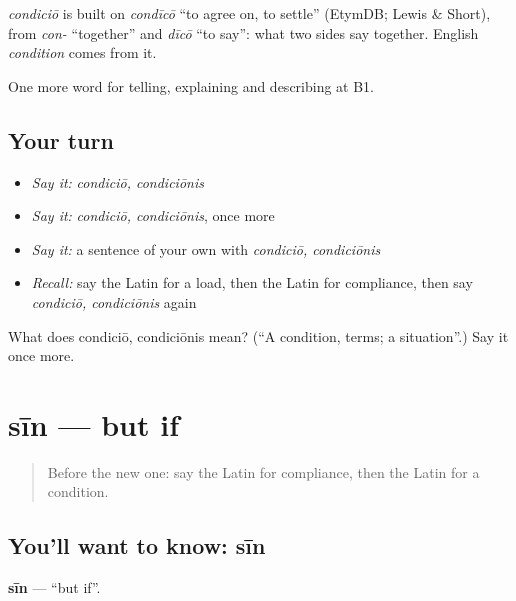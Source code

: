 \begin{cousinweb}
\emph{condiciō} is built on \emph{condīcō} \textquotedblleft{}to agree on, to settle\textquotedblright{} (EtymDB; Lewis \& Short), from \emph{con-} \textquotedblleft{}together\textquotedblright{} and \emph{dīcō} \textquotedblleft{}to say\textquotedblright{}: what two sides say together. English \emph{condition} comes from it.
\end{cousinweb}

\begin{grammarlens}[title={What you've built}]
One more word for telling, explaining and describing at B1.
\end{grammarlens}

\subsection*{Your turn}
\begin{itemize}
\raggedright
  \item \emph{Say it:} \emph{condiciō, condiciōnis}
  \item \emph{Say it:} \emph{condiciō, condiciōnis}, once more
  \item \emph{Say it:} a sentence of your own with \emph{condiciō, condiciōnis}
  \item \emph{Recall:} say the Latin for a load, then the Latin for compliance, then say \emph{condiciō, condiciōnis} again
\end{itemize}

\begin{tcolorbox}[breakable,colback=teal!4,colframe=teal!35!black,title={Before you move on}]
What does condiciō, condiciōnis mean? (\textquotedblleft{}A condition, terms; a situation\textquotedblright{}.) Say it once more.
\end{tcolorbox}
\section[sīn]{sīn — but if}

\label{lesson:LA-C390-sin}



\begin{quote}
Before the new one: say the Latin for compliance, then the Latin for a condition.
\end{quote}

\subsection*{You'll want to know: sīn}
\textbf{sīn} — \textquotedblleft{}but if\textquotedblright{}.

